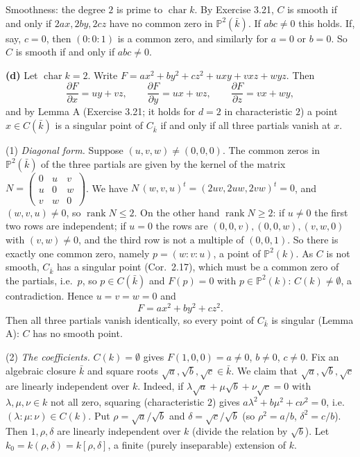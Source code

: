 \documentclass[11pt]{article}
\begin{document}
Smoothness: the degree $2$ is prime to $\operatorname{char}k$. By Exercise 3.21, $C$ is smooth if and only if $2ax,2by,2cz$ have no common zero in $\mathbb P^2(\bar k)$. If $abc\neq0$ this holds. If, say, $c=0$, then $(0:0:1)$ is a common zero, and similarly for $a=0$ or $b=0$. So $C$ is smooth if and only if $abc\neq0$.

\textbf{(d)} Let $\operatorname{char}k=2$. Write $F=ax^2+by^2+cz^2+uxy+vxz+wyz$. Then
\[ \frac{\partial F}{\partial x}=uy+vz,\qquad\frac{\partial F}{\partial y}=ux+wz,\qquad\frac{\partial F}{\partial z}=vx+wy, \]
and by Lemma A (Exercise 3.21; it holds for $d=2$ in characteristic $2$) a point $x\in C(\bar k)$ is a singular point of $C_{\bar k}$ if and only if all three partials vanish at $x$.

(1) \emph{Diagonal form.} Suppose $(u,v,w)\neq(0,0,0)$. The common zeros in $\mathbb P^2(\bar k)$ of the three partials are given by the kernel of the matrix $N=\begin{pmatrix}0&u&v\\u&0&w\\v&w&0\end{pmatrix}$. We have $N\,(w,v,u)^t=(2uv,2uw,2vw)^t=0$, and $(w,v,u)\neq0$, so $\operatorname{rank}N\le2$. On the other hand $\operatorname{rank}N\ge2$: if $u\neq0$ the first two rows are independent; if $u=0$ the rows are $(0,0,v),(0,0,w),(v,w,0)$ with $(v,w)\neq0$, and the third row is not a multiple of $(0,0,1)$. So there is exactly one common zero, namely $p=(w:v:u)$, a point of $\mathbb P^2(k)$. As $C$ is not smooth, $C_{\bar k}$ has a singular point (Cor.~2.17), which must be a common zero of the partials, i.e.\ $p$, so $p\in C(\bar k)$ and $F(p)=0$ with $p\in\mathbb P^2(k)$: $C(k)\neq\emptyset$, a contradiction. Hence $u=v=w=0$ and
\[ F=ax^2+by^2+cz^2. \]
Then all three partials vanish identically, so every point of $C_{\bar k}$ is singular (Lemma A): $C$ has no smooth point.

(2) \emph{The coefficients.} $C(k)=\emptyset$ gives $F(1,0,0)=a\neq0$, $b\neq0$, $c\neq0$. Fix an algebraic closure $\bar k$ and square roots $\sqrt a,\sqrt b,\sqrt c\in\bar k$. We claim that $\sqrt a,\sqrt b,\sqrt c$ are linearly independent over $k$. Indeed, if $\lambda\sqrt a+\mu\sqrt b+\nu\sqrt c=0$ with $\lambda,\mu,\nu\in k$ not all zero, squaring (characteristic $2$) gives $a\lambda^2+b\mu^2+c\nu^2=0$, i.e.\ $(\lambda:\mu:\nu)\in C(k)$. Put $\rho=\sqrt a/\sqrt b$ and $\delta=\sqrt c/\sqrt b$ (so $\rho^2=a/b$, $\delta^2=c/b$). Then $1,\rho,\delta$ are linearly independent over $k$ (divide the relation by $\sqrt b$). Let $k_0=k(\rho,\delta)=k[\rho,\delta]$, a finite (purely inseparable) extension of $k$.
\end{document}

